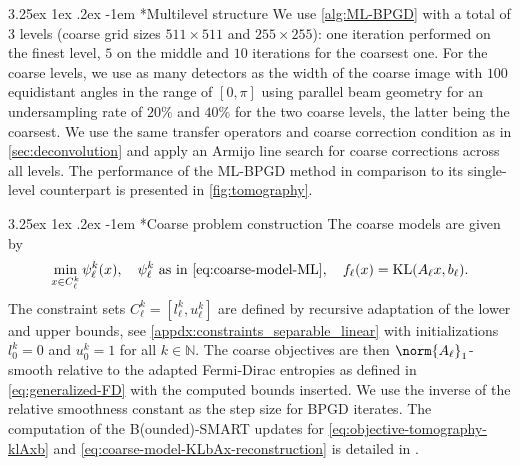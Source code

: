 \documentclass[11pt,reqno]{amsart}
\makeatletter
\numberwithin{equation}{section}
\numberwithin{figure}{section}
\theoremstyle{plain}
\theoremstyle{definition}
\newcommand{\N}{\mathbb{N}}
\DeclareMathOperator{\KL}{KL}
\renewcommand\paragraph{\@startsection{paragraph}{4}{0pt}%
  {3.25ex \@plus 1ex \@minus .2ex}%
  {-1em}
  {\normalfont\itshape}*}
\makeatother
\begin{document}
\paragraph{Multilevel structure} We use \cref{alg:ML-BPGD} with a total of $3$ levels (coarse grid sizes $511 \times 511$ and $255 \times 255$): one iteration performed on the finest level, $5$ on the middle and $10$ iterations for the coarsest one.
For the coarse levels, we use as many detectors as the width of the coarse image with $100$ equidistant angles in the range of $[0, \pi]$ using parallel beam geometry for an undersampling rate of  $20\%$ and $40\%$ for the two coarse levels, the latter being the coarsest. We use the same transfer operators and coarse correction condition as in \cref{sec:deconvolution} and apply an Armijo line search for coarse corrections across all levels. The performance of the ML-BPGD method in comparison to its single-level counterpart is presented in \cref{fig:tomography}.

\paragraph{Coarse problem construction}
The coarse models are given by
\begin{equation} \label{eq:coarse-model-KLbAx-reconstruction}
    \min_{x \in C_\ell^k} \psi_{\ell}^k(x), \quad \psi_{\ell}^k \text{ as in } \eqref{eq:coarse-model-ML}, \quad f_\ell(x) = \KL(A_\ell x, b_\ell)  .  
\end{equation} 
The constraint sets $C_\ell^k = [l_\ell^k, u_\ell^k]$ are defined by recursive adaptation of the lower and upper bounds, see \cref{appdx:constraints_separable_linear} with initializations $l_0^k = 0$ and $u_0^k = 1$ for all $k \in \N$.
The coarse objectives are then $\norm{A_\ell}_1$-smooth relative to the adapted Fermi-Dirac entropies as defined in \eqref{eq:generalized-FD} with the computed bounds inserted. We use the inverse of the relative smoothness constant as the step size for BPGD iterates. The computation of the B(ounded)-SMART updates for \eqref{eq:objective-tomography-klAxb} and \eqref{eq:coarse-model-KLbAx-reconstruction} is detailed in . 
\end{document}
